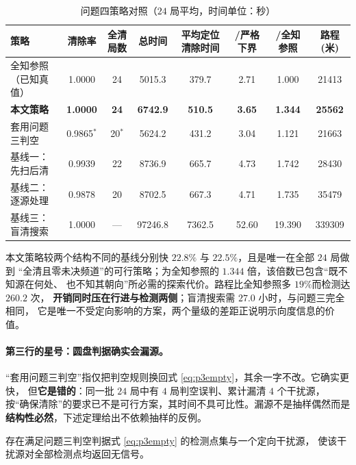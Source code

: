 \documentclass[withoutpreface, bwprint]{cumcmthesis}
\begin{document}
\begin{table}[H]
  \centering
  \caption{问题四策略对照（$24$ 局平均，时间单位：秒）}
  \label{tab:p4compare}
  \footnotesize
  \begin{tabularx}{\textwidth}{Xccccccc}
    \toprule
    策略 & 清除率 & 全清局数 & 总时间 & 平均定位清除时间 & /严格下界 & /全知参照 & 路程(米) \\
    \midrule
    全知参照（已知真值） & 1.0000 & 24 & 5015.3 & 379.7 & 2.71 & 1.000 & 21413 \\
    \textbf{本文策略} & \textbf{1.0000} & \textbf{24} & \textbf{6742.9} & \textbf{510.5} & \textbf{3.65} & \textbf{1.344} & \textbf{25562} \\
    套用问题三判空 & 0.9865$^{*}$ & 20$^{*}$ & 5624.2 & 431.2 & 3.04 & 1.121 & 21663 \\
    基线一：先扫后清 & 0.9939 & 22 & 8736.9 & 665.7 & 4.73 & 1.742 & 28430 \\
    基线二：逐源处理 & 0.9878 & 20 & 8702.5 & 667.3 & 4.71 & 1.735 & 35479 \\
    基线三：盲清搜索 & 1.0000 & --- & 97246.8 & 7362.5 & 52.60 & 19.390 & 339309 \\
    \bottomrule
  \end{tabularx}
\end{table}

本文策略较两个结构不同的基线分别快 $22.8\%$ 与 $22.5\%$，且是唯一在全部 $24$ 局做到
“全清且零未决频道”的可行策略；为全知参照的 $1.344$ 倍，该倍数已包含“既不知源在何处、
也不知其朝向”所必需的探索代价。路程比全知参照多 $19\%$而检测达 $260.2$ 次，
\textbf{开销同时压在行进与检测两侧}；盲清搜索需 $27.0$ 小时，与问题三完全相同，
它是唯一不受定向影响的方案，两个量级的差距正说明示向度信息的价值。

\paragraph{第三行的星号：圆盘判据确实会漏源。}
“套用问题三判空”指仅把判空规则换回式 \eqref{eq:p3empty}，其余一字不改。它确实更快，
但\textbf{它是错的}：同一批 $24$ 局中有 $4$ 局判空误判、累计漏清 $4$ 个干扰源，
按“确保清除”的要求已不是可行方案，其时间不具可比性。漏源不是抽样偶然而是
\textbf{结构性必然}，下述定理给出不依赖抽样的反例。

\begin{theorem}[圆盘判据在问题四中必然失效]
\label{thm:p4counter}
存在满足问题三判空判据式 \eqref{eq:p3empty} 的检测点集与一个定向干扰源，
使该干扰源对全部检测点均返回无信号。
\end{theorem}
\end{document}
